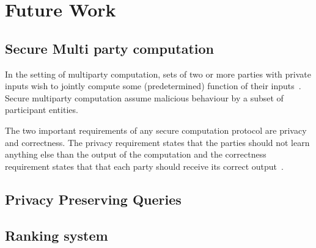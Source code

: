 \chapter{Future Work}
\label{future_work}

\section{Secure Multi party computation}
\label{future_work:mpc}

In the setting of multiparty computation, sets of two or more parties with private inputs wish to jointly compute some (predetermined) function of their inputs~\cite{mpc}. Secure multiparty computation assume malicious behaviour by a subset of participant entities.

The two important requirements of any secure computation protocol are privacy and correctness. The privacy requirement states that the parties should not learn anything else than the output of the computation and the correctness requirement states that that each party should receive its correct output~\cite{mpc}.

\section{Privacy Preserving Queries}
\label{future_work:ppq}

\section{Ranking system}
\label{future_work:ranking_system}
